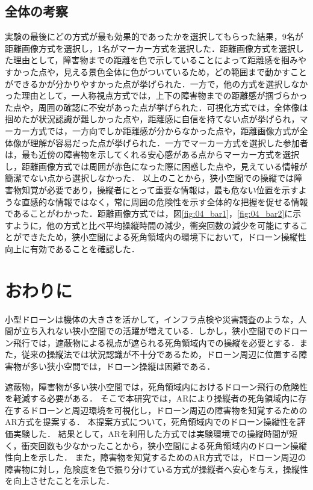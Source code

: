 \documentclass[submit,techrep]{ipsj}
\begin{document}
\subsection{全体の考察}
実験の最後にどの方式が最も効果的であったかを選択してもらった結果，9名が距離画像方式を選択し，1名がマーカー方式を選択した．距離画像方式を選択した理由として，障害物までの距離を色で示していることによって距離感を掴みやすかった点や，見える景色全体に色がついているため，どの範囲まで動かすことができるかが分かりやすかった点が挙げられた．一方で，他の方式を選択しなかった理由として，一人称視点方式では，上下の障害物までの距離感が掴づらかった点や，周囲の確認に不安があった点が挙げられた．可視化方式では，全体像は掴めたが状況認識が難しかった点や，距離感に自信を持てない点が挙げられ，マーカー方式では，一方向でしか距離感が分からなかった点や，距離画像方式が全体像が理解が容易だった点が挙げられた．一方でマーカー方式を選択した参加者は，最も近傍の障害物を示してくれる安心感がある点からマーカー方式を選択し，距離画像方式では周囲が赤色になった際に困惑した点や，見えている情報が簡潔でない点から選択しなかった．
以上のことから，狭小空間での操縦では障害物知覚が必要であり，操縦者にとって重要な情報は，最も危ない位置を示すような直感的な情報ではなく，常に周囲の危険性を示す全体的な把握を促せる情報であることがわかった．距離画像方式では，図\ref{fig:04_bar1}，\ref{fig:04_bar2}に示すように，他の方式と比べ平均操縦時間の減少，衝突回数の減少を可能にすることができたため，狭小空間による死角領域内の環境下において，ドローン操縦性向上に有効であることを確認した．




\section{おわりに}

小型ドローンは機体の大きさを活かして，インフラ点検や災害調査のような，人間が立ち入れない狭小空間での活躍が増えている．しかし，狭小空間でのドローン飛行では，遮蔽物による視点が遮られる死角領域内での操縦を必要とする．また，従来の操縦法では状況認識が不十分であるため，ドローン周辺に位置する障害物が多い狭小空間では，ドローン操縦は困難である．\par
遮蔽物，障害物が多い狭小空間では，死角領域内におけるドローン飛行の危険性を軽減する必要がある．
そこで本研究では，ARにより操縦者の死角領域内に存在するドローンと周辺環境を可視化し，ドローン周辺の障害物を知覚するためのAR方式を提案する．
本提案方式について，死角領域内でのドローン操縦性を評価実験した．
結果として，ARを利用した方式では実験環境での操縦時間が短く，衝突回数も少なかったことから，狭小空間による死角領域内のドローン操縦性向上を示した．
また，障害物を知覚するためのAR方式では，ドローン周辺の障害物に対し，危険度を色で振り分けている方式が操縦者へ安心を与え，操縦性を向上させたことを示した．
\end{document}
